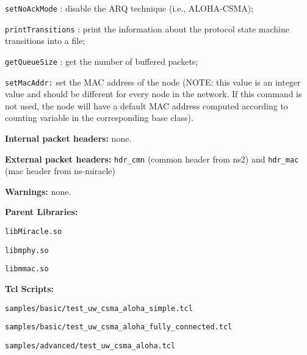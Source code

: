 \begin{description}
\begin{description}
      \item {\tt setNoAckMode} : disable the ARQ technique (i.e., ALOHA-CSMA); 
      \item {\tt printTransitions} : print the information about the protocol state machine transitions into a file;	
      \item {\tt getQueueSize} : get the number of buffered packets;
      \item {\tt setMacAddr:} set the MAC address of the node (NOTE: this value is an integer value and should be different for every node in the network. If this command is not used, the node will have a default MAC address computed according to counting variable in the corresponding base class).
  \end{description}
   \item {\bf Internal packet headers:}  none.
   \item {\bf External packet headers:}  {\tt hdr\_cmn} (common header from ns2) and  {\tt hdr\_mac} (mac header from ns-miracle)
   \item {\bf Warnings:} none.
   \item {\bf Parent Libraries:}
         \begin{description}
         \item {\tt libMiracle.so}
	      \item {\tt libmphy.so} 
	      \item {\tt libmmac.so}
        \end{description}
   \item {\bf Tcl Scripts:} 
      \begin{description}
	     \item {\tt samples/basic/test\_uw\_csma\_aloha\_simple.tcl}
	     \item {\tt samples/basic/test\_uw\_csma\_aloha\_fully\_connected.tcl}
        \item {\tt samples/advanced/test\_uw\_csma\_aloha.tcl} 
      \end{description}      
\end{description}

\vspace{1 cm}

